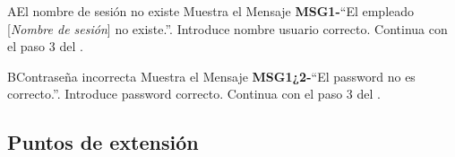 		\begin{UCtrayectoriaA}{A}{El nombre de sesión no existe}
			\UCpaso[\UCactor] Muestra el Mensaje {\bf MSG1-}``El empleado [{\em Nombre de sesión}] no existe.''.
			\UCpaso[\UCactor] Introduce nombre usuario correcto.
			\UCpaso[] Continua con el paso 3 del .
		\end{UCtrayectoriaA}
		
		\begin{UCtrayectoriaA}{B}{Contraseña incorrecta}
			\UCpaso Muestra el Mensaje {\bf MSG1¿2-}``El password no es correcto.''.
			\UCpaso[\UCactor] Introduce password correcto.
			\UCpaso[] Continua con el paso 3 del .
		\end{UCtrayectoriaA}


\subsection{Puntos de extensión}
		
		

